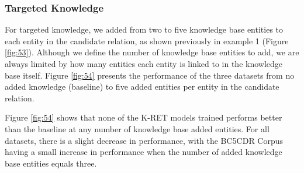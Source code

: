\subsubsection{Targeted Knowledge}

For targeted knowledge, we added from two to five knowledge base entities to each entity in the candidate relation, as shown previously in example 1 (Figure \ref{fig:53}). Although we define the number of knowledge base entities to add, we are always limited by how many entities each entity is linked to in the knowledge base itself. Figure \ref{fig:54} presents the performance of the three datasets from no added knowledge (baseline) to five added entities per entity in the candidate relation.

Figure \ref{fig:54} shows that none of the K-RET models trained performs better than the baseline at any number of knowledge base added entities. For all datasets, there is a slight decrease in performance, with the BC5CDR Corpus having a small increase in performance when the number of added knowledge base entities equals three.  

